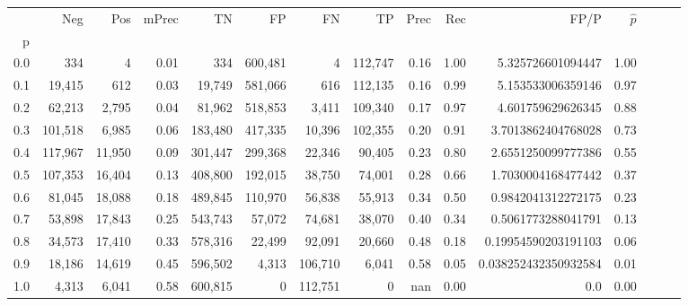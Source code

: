 \begin{tabular}{rrrrrrrrrrrrrrr}
\toprule
{} &      Neg &     Pos & mPrec &       TN &       FP &       FN &       TP &  Prec &   Rec &                  FP/P & $\hat{p}$ \\
p   &          &         &       &          &          &          &          &       &       &                       &           \\
\midrule
0.0 &      334 &       4 &  0.01 &      334 &  600,481 &        4 &  112,747 &  0.16 &  1.00 &     5.325726601094447 &      1.00 \\
0.1 &   19,415 &     612 &  0.03 &   19,749 &  581,066 &      616 &  112,135 &  0.16 &  0.99 &     5.153533006359146 &      0.97 \\
0.2 &   62,213 &   2,795 &  0.04 &   81,962 &  518,853 &    3,411 &  109,340 &  0.17 &  0.97 &     4.601759629626345 &      0.88 \\
0.3 &  101,518 &   6,985 &  0.06 &  183,480 &  417,335 &   10,396 &  102,355 &  0.20 &  0.91 &    3.7013862404768028 &      0.73 \\
0.4 &  117,967 &  11,950 &  0.09 &  301,447 &  299,368 &   22,346 &   90,405 &  0.23 &  0.80 &    2.6551250099777386 &      0.55 \\
0.5 &  107,353 &  16,404 &  0.13 &  408,800 &  192,015 &   38,750 &   74,001 &  0.28 &  0.66 &    1.7030004168477442 &      0.37 \\
0.6 &   81,045 &  18,088 &  0.18 &  489,845 &  110,970 &   56,838 &   55,913 &  0.34 &  0.50 &    0.9842041312272175 &      0.23 \\
0.7 &   53,898 &  17,843 &  0.25 &  543,743 &   57,072 &   74,681 &   38,070 &  0.40 &  0.34 &    0.5061773288041791 &      0.13 \\
0.8 &   34,573 &  17,410 &  0.33 &  578,316 &   22,499 &   92,091 &   20,660 &  0.48 &  0.18 &   0.19954590203191103 &      0.06 \\
0.9 &   18,186 &  14,619 &  0.45 &  596,502 &    4,313 &  106,710 &    6,041 &  0.58 &  0.05 &  0.038252432350932584 &      0.01 \\
1.0 &    4,313 &   6,041 &  0.58 &  600,815 &        0 &  112,751 &        0 &   nan &  0.00 &                   0.0 &      0.00 \\
\bottomrule
\end{tabular}
